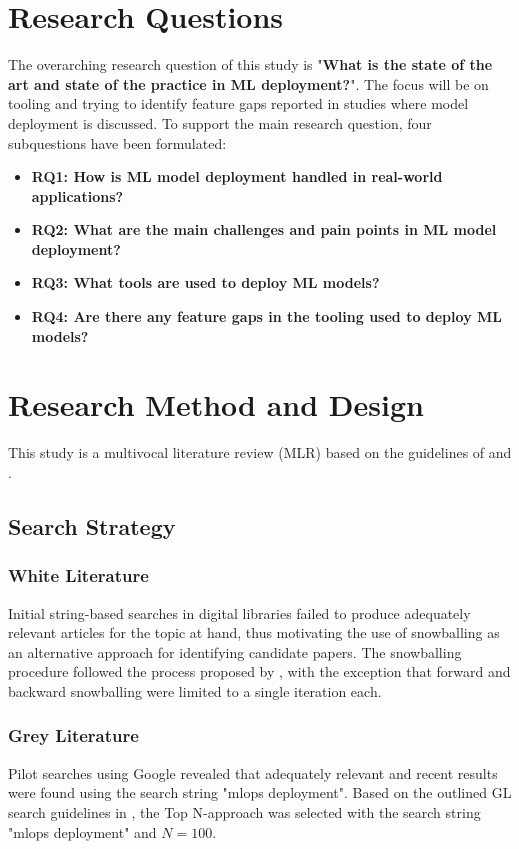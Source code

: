 \section{Research Questions}
\label{sec:research_questions}
The overarching research question of this study is "\textbf{What is the state of the art and state of the practice in ML deployment?}".
The focus will be on tooling and trying to identify feature gaps reported in studies where model deployment is discussed.
To support the main research question, four subquestions have been formulated:
\begin{itemize}
    \item \textbf{RQ1: How is ML model deployment handled in real-world applications?}
    \item \textbf{RQ2: What are the main challenges and pain points in ML model deployment?}
    \item \textbf{RQ3: What tools are used to deploy ML models?}
    \item \textbf{RQ4: Are there any feature gaps in the tooling used to deploy ML models?}
\end{itemize}

\section{Research Method and Design}
\label{sec:research_method}
This study is a multivocal literature review (MLR) based on the guidelines of \textcite{Kitchenham07guidelinesfor} and \textcite{Garousi2019}.

\subsection{Search Strategy}
\subsubsection{White Literature}
Initial string-based searches in digital libraries failed to produce adequately relevant articles for the topic at hand, thus motivating the use of snowballing as an alternative approach for identifying candidate papers.
The snowballing procedure followed the process proposed by \textcite{Wohlin2014}, with the exception that forward and backward snowballing were limited to a single iteration each.

\subsubsection{Grey Literature}
Pilot searches using Google revealed that adequately relevant and recent results were found using the search string "mlops deployment".
Based on the outlined GL search guidelines in \cite{Garousi2016}, the Top N-approach was selected with the search string "mlops deployment" and $N=100$.

